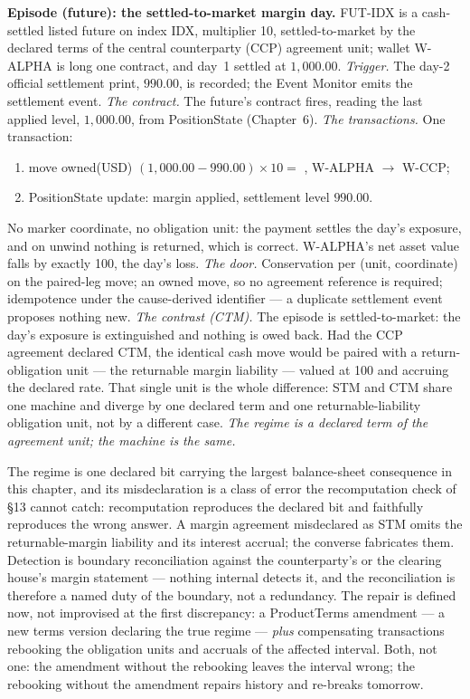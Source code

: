\medskip\noindent\textbf{Episode (future): the settled-to-market margin day.}
FUT-IDX is a cash-settled listed future on index IDX, multiplier 10,
settled-to-market by the declared terms of the central counterparty (CCP)
agreement unit; wallet W-ALPHA is long one contract, and day~1 settled at
$1{,}000.00$.
\emph{Trigger.} The day-2 official settlement print, $990.00$, is recorded;
the Event Monitor emits the settlement event.
\emph{The contract.} The future's contract fires, reading the last applied
level, $1{,}000.00$, from PositionState (Chapter~6).
\emph{The transactions.} One transaction:
\begin{enumerate}[label=(\arabic*),nosep]
\item move owned(USD) $(1{,}000.00-990.00)\times 10 = $ , W-ALPHA
$\to$ W-CCP;
\item PositionState update: margin applied, settlement level $990.00$.
\end{enumerate}
No marker coordinate, no obligation unit: the payment settles the day's
exposure, and on unwind nothing is returned, which is correct. W-ALPHA's net
asset value falls by exactly 100, the day's loss.
\emph{The door.} Conservation per (unit, coordinate) on the paired-leg move;
an owned move, so no agreement reference is required; idempotence under the
cause-derived identifier --- a duplicate settlement event proposes nothing
new.
\emph{The contrast (CTM).} The episode is settled-to-market: the day's exposure is
extinguished and nothing is owed back. Had the CCP agreement declared CTM, the
identical cash move would be paired with a return-obligation unit --- the returnable
margin liability --- valued at 100 and accruing the declared rate. That single unit is
the whole difference: STM and CTM share one machine and diverge by one declared term
and one returnable-liability obligation unit, not by a different case.
\emph{The regime is a declared term of the agreement unit; the machine is the
same.}

\medskip
The regime is one declared bit carrying the largest balance-sheet consequence
in this chapter, and its misdeclaration is a class of error the recomputation
check of \S13 cannot catch: recomputation reproduces the declared bit and
faithfully reproduces the wrong answer. A margin agreement misdeclared as STM
omits the returnable-margin liability and its interest accrual; the converse
fabricates them. Detection is boundary reconciliation against the
counterparty's or the clearing house's margin statement --- nothing internal
detects it, and the reconciliation is therefore a named duty of the boundary,
not a redundancy. The repair is defined now, not improvised at the first
discrepancy: a ProductTerms amendment --- a new terms version declaring the
true regime --- \emph{plus} compensating transactions rebooking the obligation
units and accruals of the affected interval. Both, not one: the amendment
without the rebooking leaves the interval wrong; the rebooking without the
amendment repairs history and re-breaks tomorrow.

